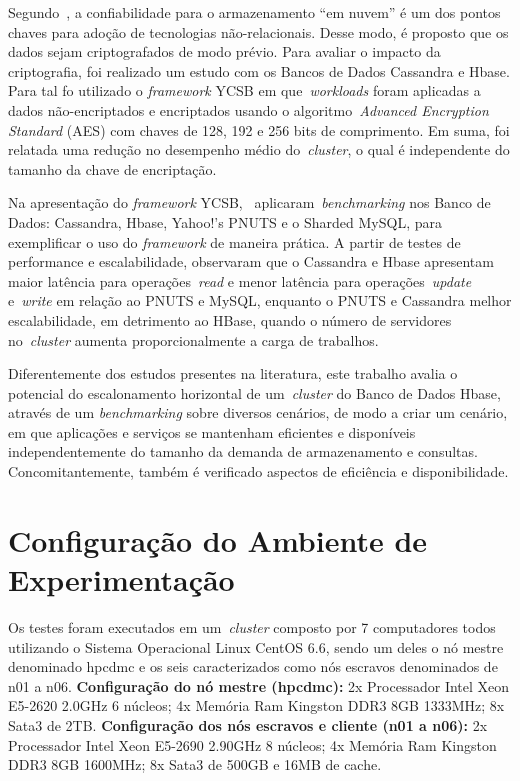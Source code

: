 \documentclass[12pt]{article}
\begin{document}
Segundo~\cite{waage2014benchmarking}, a confiabilidade para o armazenamento ``em nuvem'' é um dos pontos chaves para adoção de tecnologias não-relacionais. Desse modo, é proposto que os dados sejam criptografados de modo prévio. Para avaliar o impacto da criptografia, foi realizado um estudo com os Bancos de Dados Cassandra e Hbase. Para tal fo utilizado o \emph{framework} YCSB em que~\emph{workloads} foram aplicadas a dados não-encriptados e encriptados usando o algoritmo~\emph{Advanced Encryption Standard} (AES) com chaves de 128, 192 e 256 bits de comprimento. Em suma, foi relatada uma redução no desempenho médio do~\emph{cluster}, o qual é independente do tamanho da chave de encriptação.

Na apresentação do \textit{framework} YCSB,~\cite{cooper2010benchmarking} aplicaram~\emph{benchmarking} nos Banco de Dados: Cassandra, Hbase, Yahoo!’s PNUTS e o Sharded MySQL, para exemplificar o uso do \textit{framework} de maneira prática. A partir de testes de performance e escalabilidade, observaram que o Cassandra e Hbase apresentam maior latência para operações~\emph{read} e menor latência para operações~\emph{update} e~\emph{write} em relação ao PNUTS e MySQL, enquanto o PNUTS e Cassandra melhor escalabilidade, em detrimento ao HBase, quando o número de servidores no~\emph{cluster} aumenta proporcionalmente a carga de trabalhos.

Diferentemente dos estudos presentes na literatura, este trabalho avalia o potencial do escalonamento horizontal de um~\emph{cluster} do Banco de Dados Hbase, através de um \textit{benchmarking} sobre diversos cenários, de modo a criar um cenário, em que aplicações e serviços se mantenham eficientes e disponíveis independentemente do tamanho da demanda de armazenamento e consultas. Concomitantemente, também é verificado aspectos de eficiência e disponibilidade.

\section{Configuração do Ambiente de Experimentação}
\label{sec:conf-experimento}

Os testes foram executados em um~\emph{cluster} composto por 7 computadores todos utilizando o Sistema Operacional Linux CentOS 6.6, sendo um deles o nó mestre denominado hpcdmc e os seis caracterizados como nós escravos denominados de n01 a n06. \textbf{Configuração do nó mestre (hpcdmc):} 2x Processador Intel Xeon E5-2620 2.0GHz 6 núcleos; 4x Memória Ram Kingston DDR3 8GB 1333MHz; 8x Sata3 de 2TB. \textbf{Configuração dos nós escravos e cliente (n01 a n06):} 2x Processador Intel Xeon E5-2690 2.90GHz 8 núcleos; 4x Memória Ram Kingston DDR3 8GB 1600MHz; 8x Sata3 de 500GB e 16MB de cache.
\end{document}
